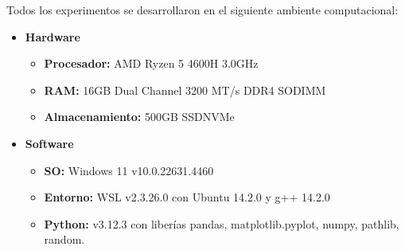 Todos los experimentos se desarrollaron en el siguiente ambiente computacional:

\begin{itemize}
    \item \textbf{Hardware}
    \begin{itemize}
        \item \textbf{Procesador:} AMD Ryzen 5 4600H 3.0GHz
        \item \textbf{RAM:} 16GB Dual Channel 3200 MT/s DDR4 SODIMM
        \item \textbf{Almacenamiento:} 500GB SSDNVMe
    \end{itemize}
    \item \textbf{Software}
    \begin{itemize}
        \item \textbf{SO:} Windows 11 v10.0.22631.4460
        \item \textbf{Entorno:} WSL v2.3.26.0 con Ubuntu 14.2.0 y g++ 14.2.0
        \item \textbf{Python:} v3.12.3 con liberías pandas, matplotlib.pyplot, numpy, pathlib, random.
    \end{itemize}
\end{itemize}